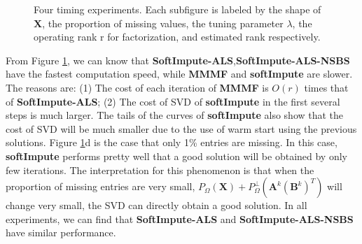 \documentclass[11pt]{article}
\begin{document}
\begin{figure}[ht!]
{\begin{minipage}{6.6cm}
\end{minipage}}
\caption{Four timing experiments. Each subfigure is labeled by the shape of $\boldsymbol{X}$, the proportion of missing values, the tuning parameter $\lambda$, the operating rank r for factorization, and estimated rank respectively. }
\label{fig:1}	                                                    
\end{figure}

	From Figure \ref{fig:1}, we can know that \textbf{SoftImpute-ALS},\textbf{SoftImpute-ALS-NSBS} have the fastest computation speed, while \textbf{MMMF} and \textbf{softImpute} are slower. The reasons are: (1) The cost of each iteration of \textbf{MMMF} is $O(r)$ times that of \textbf{SoftImpute-ALS}; (2) The cost of SVD of \textbf{softImpute} in the first several steps is much larger. The tails of the curves of \textbf{softImpute} also show that the cost of SVD will be much smaller due to the use of warm start using the previous solutions. Figure \ref{fig:1}d is the case that only 1\% entries are missing. In this case, \textbf{softImpute} performs pretty well that a good solution will be obtained by only few iterations. The interpretation for this phenomenon is that when the proportion of missing entries are very small, $P_{\Omega}(\boldsymbol{X})+P_{\Omega}^{\perp}(\boldsymbol{A}^k(\boldsymbol{B}^k)^T)$ will change very small, the SVD can directly obtain a good solution. In all experiments, we can find that \textbf{SoftImpute-ALS} and \textbf{SoftImpute-ALS-NSBS} have similar performance.
\end{document}
